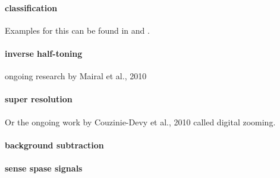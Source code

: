 \paragraph{classification} Examples for this can be found in
\cite{Mairal2008b} and \cite{Bar2009}.

\paragraph{inverse half-toning} ongoing research by Mairal et al., 2010
\cite{Mairal2010b}

\paragraph{super resolution} \cite{Yang2010} \cite{Wright2008}  
Or the ongoing work by Couzinie-Devy et al., 2010 called digital zooming.

\paragraph{background subtraction} \cite{}

\paragraph{sense spase signals}\cite{Duarte2009}







